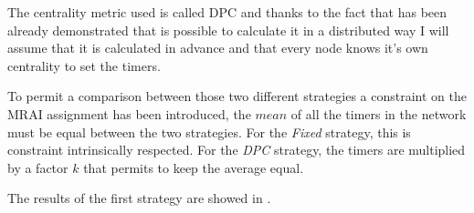 The centrality metric used is called \ac{DPC} and thanks to the fact that has been
already demonstrated that is possible to calculate it in a distributed way \cite{milani2019BGP} I will
assume that it is calculated in advance and that every node knows it's own centrality to
set the timers.

To permit a comparison between those two different strategies a constraint on the
\ac{MRAI} assignment has been introduced, the $mean$ of all the timers in the network
must be equal between the two strategies.
For the \textit{Fixed} strategy, this is constraint intrinsically respected.
For the \textit{DPC} strategy, the timers are multiplied by a factor $k$ that
permits to keep the average equal.

The results of the first strategy are showed in .

